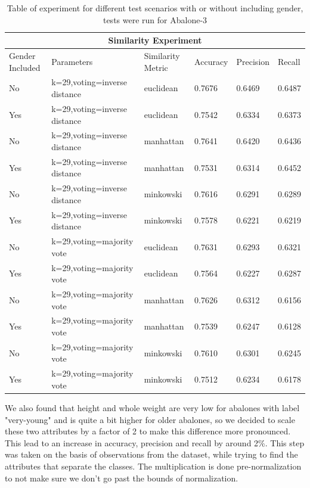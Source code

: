 \begin{table}[h]
\centering
\begin{tabular}{|p{2cm}|p{4cm}||p{2cm}|p{1.5cm}|p{1.5cm}|p{1.5cm}|}
 \hline
 \multicolumn{6}{|c|}{Similarity Experiment} \\
 \hline
 Gender Included & Parameters & Similarity Metric & Accuracy & Precision & Recall\\
 \hline
 No & k=29,voting=inverse distance &   euclidean & 0.7676  & 0.6469 & 0.6487\\
 \hline
 Yes & k=29,voting=inverse distance &   euclidean & 0.7542 & 0.6334 & 0.6373\\
 \hline
 No & k=29,voting=inverse distance &   manhattan & 0.7641 & 0.6420 & 0.6436\\ 
 \hline
 Yes & k=29,voting=inverse distance &  manhattan & 0.7531  & 0.6314 & 0.6452\\
 \hline
 No & k=29,voting=inverse distance &   minkowski & 0.7616 & 0.6291 & 0.6289\\
 \hline
 Yes & k=29,voting=inverse distance &   minkowski & 0.7578  & 0.6221 & 0.6219\\ 
 \hline
 No & k=29,voting=majority vote &   euclidean & 0.7631  & 0.6293 & 0.6321\\
 \hline
 Yes & k=29,voting=majority vote &   euclidean & 0.7564 & 0.6227 & 0.6287\\
 \hline
 No & k=29,voting=majority vote &   manhattan & 0.7626 & 0.6312 & 0.6156\\ 
 \hline
 Yes & k=29,voting=majority vote &  manhattan & 0.7539  & 0.6247 & 0.6128\\
 \hline
 No & k=29,voting=majority vote &   minkowski & 0.7610 & 0.6301 & 0.6245\\
 \hline
 Yes & k=29,voting=majority vote &   minkowski & 0.7512  & 0.6234 & 0.6178\\ 
 \hline

\end{tabular}
\caption{Table of experiment for different test scenarios with or without including gender, tests were run for Abalone-3}
\end{table}

We also found that height and whole weight are very low for abalones with label "very-young" and is quite a bit higher for older abalones, so we decided to scale these two attributes by a factor of 2 to make this difference more pronounced. This lead to an increase in accuracy, precision and recall by around 2\%. This step was taken on the basis of observations from the dataset, while trying to find the 
attributes that separate the classes. The multiplication is done pre-normalization to not make sure we don't go past the bounds of normalization. 




